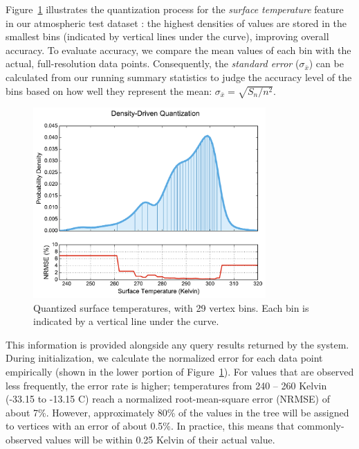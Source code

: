 Figure~\ref{fig:quantization} illustrates the quantization process for the \emph{surface temperature} feature in our atmospheric test dataset \cite{noaa_nam}: the highest densities of values are stored in the smallest bins (indicated by vertical lines under the curve), improving overall accuracy. To evaluate accuracy, we compare the mean values of each bin with the actual, full-resolution data points. Consequently, the \emph{standard error} ($\sigma_{\bar{x}}$) can be calculated from our running summary statistics to judge the accuracy level of the bins based on how well they represent the mean: $ \sigma_{\bar{x}} = \sqrt{{S_n}/{n^2}} $.
%
\begin{figure}[b!]
    \centerline{\includegraphics[width=3.5in]{figures/quantization.pdf}}
    \caption{Quantized surface temperatures, with 29 vertex bins. Each bin is indicated by a vertical line under the curve.}
    \label{fig:quantization}
\end{figure}
%
This information is provided alongside any query results returned by the system. During initialization, we calculate the normalized error for each data point empirically (shown in the lower portion of Figure~\ref{fig:quantization}). For values that are observed less frequently, the error rate is higher; temperatures from 240 -- 260 Kelvin (-33.15 to -13.15 \degree C) reach a normalized root-mean-square error (NRMSE) of about 7\%. However, approximately 80\% of the values in the tree will be assigned to vertices with an error of about 0.5\%. In practice, this means that commonly-observed values will be within 0.25 Kelvin of their actual value.

